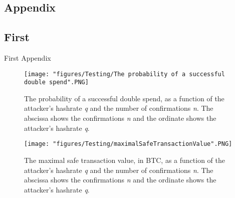 \begin{appendices}
\chapter{Appendix}

\section{First}

First Appendix

\begin{figure}
\texttt{[image: "figures/Testing/The probability of a successful double spend".PNG]}
\caption{The probability of a successful double spend, as a function of the attacker's hashrate \textit{q} and the number of confirmations \textit{n}. The abscissa shows the confirmations \textit{n} and the ordinate shows the attacker's hashrate \textit{q}.\label{fig:doubleSpend}}
\end{figure}

\begin{figure}
\texttt{[image: "figures/Testing/maximalSafeTransactionValue".PNG]}
\caption{The maximal safe transaction value, in BTC, as a function of the attacker's hashrate \textit{q} and the number of confirmations \textit{n}. The abscissa shows the confirmations \textit{n} and the ordinate shows the attacker's hashrate \textit{q}.\label{fig:maximalSafeTransactionValue}}
\end{figure}

\end{appendices}